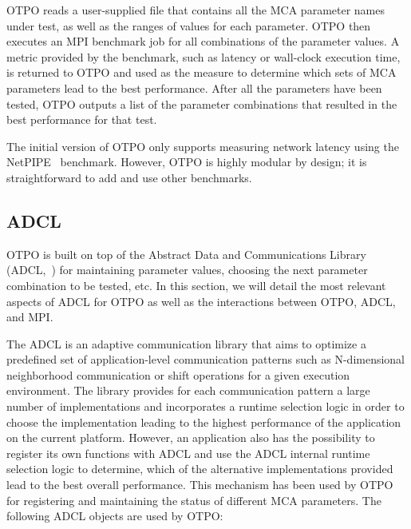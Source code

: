 OTPO reads a user-supplied file that contains all the MCA parameter
names under test, as well as the ranges of values for each parameter.
OTPO then executes an MPI benchmark job for all combinations of the
parameter values. A metric provided by the benchmark, such as latency
or wall-clock execution time, is returned to OTPO and used as the
measure to determine which sets of MCA parameters lead to the best
performance. After all the parameters have been tested, OTPO outputs a
list of the parameter combinations that resulted in the best
performance for that test.

The initial version of OTPO only supports measuring network latency
using the NetPIPE~\cite{netpipe} benchmark. However, OTPO is highly
modular by design; it is straightforward to add and use other
benchmarks.


\subsection{ADCL}

OTPO is built on top of the Abstract Data and Communications Library
(ADCL,~\cite{ADCL}) for maintaining parameter values, choosing the
next parameter combination to be tested, etc. In this section, we will
detail the most relevant aspects of ADCL for OTPO as well as the
interactions between OTPO, ADCL, and MPI.

The ADCL is an adaptive communication library that aims to optimize a
predefined set of application-level communication patterns such as
N-dimensional neighborhood communication or shift operations for a
given execution environment. The library provides for each
communication pattern a large number of implementations and
incorporates a runtime selection logic in order to choose the
implementation leading to the highest performance of the application
on the current platform. However, an application also has the
possibility to register its own functions with ADCL and use the ADCL
internal runtime selection logic to determine, which of the
alternative implementations provided lead to the best overall
performance. This mechanism has been used by OTPO for registering and
maintaining the status of different MCA parameters. The following
ADCL objects are used by OTPO:

